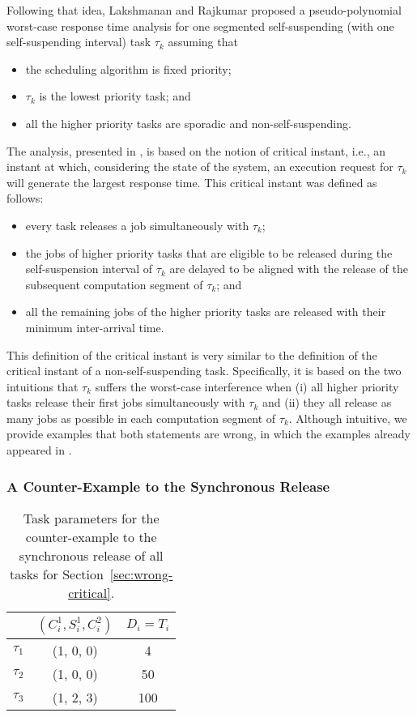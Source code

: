 Following that idea, Lakshmanan and Rajkumar \cite{LR:rtas10} proposed a pseudo-polynomial worst-case response time analysis for one segmented self-suspending (with one self-suspending interval) task $\tau_k$ assuming that 
\begin{itemize}
\item the scheduling algorithm is fixed priority;
\item $\tau_k$ is the lowest priority task;  and
\item all the higher priority tasks are sporadic and non-self-suspending.
\end{itemize}
The analysis, presented in \cite{LR:rtas10}, is based on the notion of critical instant, i.e., an instant at which, considering the state of the system, an execution request for $\tau_k$ will generate the largest response time. This critical instant was defined as follows:
\begin{itemize}
	\item every task releases a job simultaneously with $\tau_k$;
	\item the jobs of higher priority tasks that are eligible to be released during the self-suspension interval of $\tau_k$ are delayed to be aligned with the release of the subsequent computation segment of $\tau_k$; and
	\item all the remaining jobs of the higher priority tasks are released with their minimum inter-arrival time.
\end{itemize}

This definition of the critical instant is very similar to the definition of the critical instant of a non-self-suspending task. Specifically, it is based on the two intuitions that $\tau_k$ suffers the worst-case interference when (i) all higher priority tasks release their first jobs simultaneously with $\tau_k$ and (ii) they all release as many jobs as possible in each computation segment of $\tau_k$. Although intuitive, we provide examples that both statements are wrong, in which the examples already appeared in \cite{ecrts15nelissen}.

\subsubsection{A Counter-Example to the Synchronous Release}

\begin{table} 
\centering
    \begin{tabular}{|c|c|c|}
 \hline
        & $(C_i^1, S_i^1, C_i^2)$ &  $D_i=T_i$\\ 
        \hline
        $\tau_1$ & (1, 0, 0) &  4\\ 
        $\tau_2$ &  (1, 0, 0) & 50  \\ 
        $\tau_3$ & (1, 2, 3) & 100  \\
        \hline
    \end{tabular} 
    \caption{Task parameters for the counter-example to the synchronous release of all tasks for Section~\ref{sec:wrong-critical}.}
    \label{table:ex-synch-releases}
\end{table}

